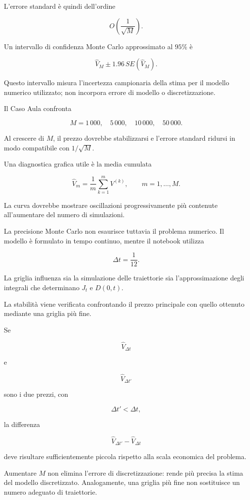 L'errore standard \`e quindi dell'ordine

\[
O\left(\frac{1}{\sqrt{M}}\right).
\]

Un intervallo di confidenza Monte Carlo approssimato al \(95\%\) \`e

\[
\widehat V_M
\pm
1.96\,SE(\widehat V_M).
\]

Questo intervallo misura l'incertezza campionaria della stima per il modello
numerico utilizzato; non incorpora errore di modello o discretizzazione.

Il Caso Aula confronta

\[
M
=
1\,000,
\quad
5\,000,
\quad
10\,000,
\quad
50\,000.
\]

Al crescere di \(M\), il prezzo dovrebbe stabilizzarsi e l'errore standard
ridursi in modo compatibile con \(1/\sqrt{M}\).

Una diagnostica grafica utile \`e la media cumulata

\[
\widehat V_m
=
\frac{1}{m}
\sum_{k=1}^{m}
V^{(k)},
\qquad
m=1,\ldots,M.
\]

La curva dovrebbe mostrare oscillazioni progressivamente pi\`u contenute
all'aumentare del numero di simulazioni.

La precisione Monte Carlo non esaurisce tuttavia il problema numerico. Il
modello \`e formulato in tempo continuo, mentre il notebook utilizza

\[
\Delta t=\frac{1}{12}.
\]

La griglia influenza sia la simulazione delle traiettorie sia
l'approssimazione degli integrali che determinano \(J_t\) e \(D(0,t)\).

La stabilit\`a viene verificata confrontando il prezzo principale con quello
ottenuto mediante una griglia pi\`u fine.

Se

\[
\widehat V_{\Delta t}
\]

\noindent e

\[
\widehat V_{\Delta t'}
\]

\noindent sono i due prezzi, con

\[
\Delta t'<\Delta t,
\]

\noindent la differenza

\[
\widehat V_{\Delta t'}
-
\widehat V_{\Delta t}
\]

\noindent deve risultare sufficientemente piccola rispetto alla scala economica del
problema.

Aumentare \(M\) non elimina l'errore di discretizzazione: rende pi\`u precisa
la stima del modello discretizzato. Analogamente, una griglia pi\`u fine non
sostituisce un numero adeguato di traiettorie.

